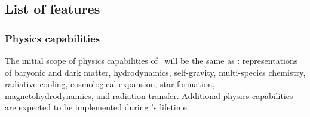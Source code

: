 \documentclass[11pt]{article}
\begin{document}
\subsection{List of features}



%
%
    \subsubsection{Physics capabilities}

    The initial scope of physics capabilities of \cello\ will be the
    same as \enzo: representations of baryonic and dark matter,
    hydrodynamics, self-gravity, multi-species chemistry, radiative
    cooling, cosmological expansion, star formation,
    magnetohydrodynamics, and radiation transfer.  Additional physics
    capabilities are expected to be implemented during \cello's
    lifetime.
\end{document}

